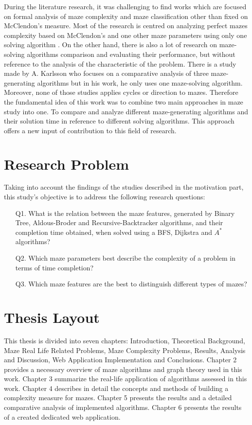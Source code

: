 During the literature research, it was challenging to find works which are focused on formal analysis of maze complexity and maze classification other than fixed on 
McClendon's measure. Most of the research is centred on analyzing perfect mazes complexity based on McClendon's and one other maze parameters using only one solving algorithm \cite{2,4}.
On the other hand, there is also a lot of research on maze-solving algorithms comparison and evaluating their performance, but without reference to the analysis of the 
characteristic of the problem\cite{3}. There is a study made by A. Karlsson \cite{1} who focuses on a comparative analysis of three maze-generating algorithms
but in his work, he only uses one maze-solving algorithm. Moreover, none of those studies applies cycles or direction to mazes. Therefore the fundamental idea of this work was to combine two main approaches in maze study into one. To compare and analyze different 
maze-generating algorithms and their solution time in reference to different solving algorithms. This approach offers a new input of contribution to this field of research.

\section{Research Problem}
Taking into account the findings of the studies described in the motivation part, this study's objective is to address the following research questions:\\
\begin{enumerate}
    \item [Q1.] What is the relation between the maze features, generated by Binary Tree, Aldous-Broder and Recursive-Backtracker algorithms,
     and their completion time obtained, when solved using a BFS, Dijkstra and $A^*$ algorithms?
    \item [Q2.] Which maze parameters best describe the complexity of a problem in terms of time completion?
    \item [Q3.] Which maze features are the best to distinguish different types of mazes?
\end{enumerate}
\section{Thesis Layout}
This thesis is divided into seven chapters: Introduction, Theoretical Background, Maze Real Life Related Problems, 
Maze Complexity Problems, Results, Analysis and Discussion, Web Application Implementation and Conclusions.
Chapter 2 provides a necessary overview of maze algorithms and graph theory used in this work. Chapter 3 summarize the real-life application of algorithms 
assessed in this work. Chapter 4 describes in detail the concepts and methods of building a complexity measure for mazes. Chapter 5 presents the 
results and a detailed comparative analysis of implemented algorithms. Chapter 6 presents the results of a created dedicated web application.
